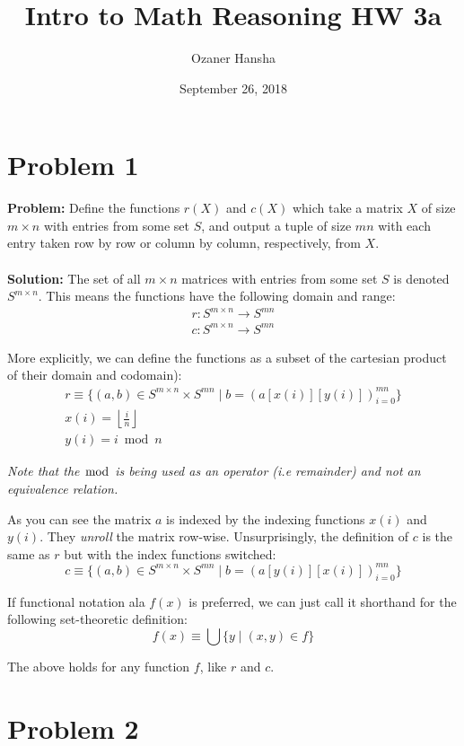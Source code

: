 \documentclass{article}
\begin{document}
\title{Intro to Math Reasoning HW 3a}
\author{Ozaner Hansha}
\date{September 26, 2018}
\maketitle

\section{Problem 1}
\textbf{Problem:} Define the functions $r(X)$ and $c(X)$ which take a matrix $X$ of size $m\times n$ with entries from some set $S$, and output a tuple of size $mn$ with each entry taken row by row or column by column, respectively, from $X$.
\\\\
\textbf{Solution:} The set of all $m\times n$ matrices with entries from some set $S$ is denoted $S^{m\times n}$. This means the functions have the following domain and range:
\begin{gather*}
  r:S^{m\times n}\to S^{mn}\\
  c:S^{m\times n}\to S^{mn}
\end{gather*}

More explicitly, we can define the functions as a subset of the cartesian product of their domain and codomain):
\begin{gather*}
  r\equiv\{(a,b)\in S^{m\times n}\times S^{mn}\mid b=(a[x(i)][y(i)])_{i=0}^{mn}\}\\
  x(i)=\left\lfloor\frac{i}{n}\right\rfloor\\
  y(i)=i \bmod n
\end{gather*}

\textit{Note that the $\bmod$ is being used as an operator (i.e remainder) and not an equivalence relation.}
\newline

As you can see the matrix $a$ is indexed by the indexing functions $x(i)$ and $y(i)$. They \textit{unroll} the matrix row-wise. Unsurprisingly, the definition of $c$ is the same as $r$ but with the index functions switched:
$$c\equiv\{(a,b)\in S^{m\times n}\times S^{mn}\mid b=(a[y(i)][x(i)])_{i=0}^{mn}\}$$

If functional notation ala $f(x)$ is preferred, we can just call it shorthand for the following set-theoretic definition:
$$f(x)\equiv\bigcup\{y\mid (x,y)\in f\}$$

The above holds for any function $f$, like $r$ and $c$.

\section{Problem 2}
\end{document}
